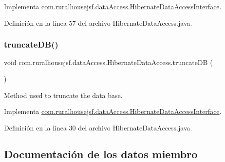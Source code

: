 Implementa \mbox{\hyperlink{interfacecom_1_1ruralhousejsf_1_1data_access_1_1_hibernate_data_access_interface_acab426a4933f3510c317816c136cec0b}{com.\+ruralhousejsf.\+data\+Access.\+Hibernate\+Data\+Access\+Interface}}.



Definición en la línea 57 del archivo Hibernate\+Data\+Access.\+java.

\mbox{\label{classcom_1_1ruralhousejsf_1_1data_access_1_1_hibernate_data_access_a81a5e60db58acfc1a3c1de2f014813d5}} 
\subsubsection{\texorpdfstring{truncateDB()}{truncateDB()}}
{\footnotesize\ttfamily void com.\+ruralhousejsf.\+data\+Access.\+Hibernate\+Data\+Access.\+truncate\+DB (\begin{DoxyParamCaption}{ }\end{DoxyParamCaption})}

Method used to truncate the data base. 

Implementa \mbox{\hyperlink{interfacecom_1_1ruralhousejsf_1_1data_access_1_1_hibernate_data_access_interface_a181eb91e600e57fe36301128022f535d}{com.\+ruralhousejsf.\+data\+Access.\+Hibernate\+Data\+Access\+Interface}}.



Definición en la línea 30 del archivo Hibernate\+Data\+Access.\+java.



\subsection{Documentación de los datos miembro}
\mbox{\label{classcom_1_1ruralhousejsf_1_1data_access_1_1_hibernate_data_access_a3f050c37956274b82491f5fcf9ce5db1}} 
